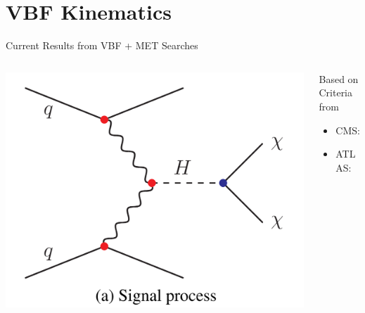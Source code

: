 \documentclass{../../bredelebeamer}
\begin{document}
\section{VBF Kinematics}
\begin{frame}{Current Results from VBF + MET Searches}
    \begin{columns}
        \begin{column}{0.4\textwidth}
            \includegraphics[width=\textwidth]{../Images/VBF.png}
        \end{column}
        \begin{column}{0.6\textwidth}
            Based on Criteria from 
            \begin{itemize}
                \item CMS: \cite{CMS:2022qva}
                \item ATLAS:\cite{ATLAS:2022yvh}
            \end{itemize}
        \end{column}
    \end{columns}
\end{frame}
\end{document}
